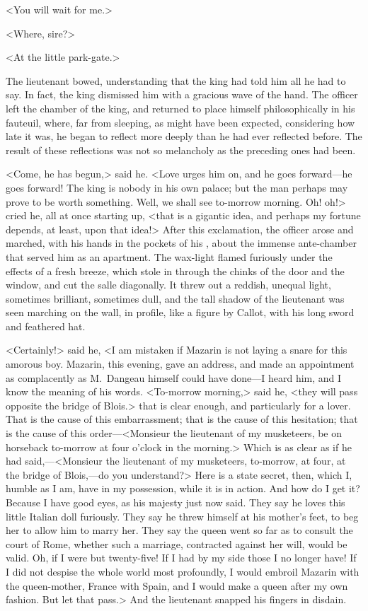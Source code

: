 <You will wait for me.>

<Where, sire?>

<At the little park-gate.>

The lieutenant bowed, understanding that the king had told him all he had to say. In fact, the king dismissed him with a gracious wave of the hand. The officer left the chamber of the king, and returned to place himself philosophically in his fauteuil, where, far from sleeping, as might have been expected, considering how late it was, he began to reflect more deeply than he had ever reflected before. The result of these reflections was not so melancholy as the preceding ones had been.

<Come, he has begun,> said he. <Love urges him on, and he goes forward—he goes forward! The king is nobody in his own palace; but the man perhaps may prove to be worth something. Well, we shall see to-morrow morning. Oh! oh!> cried he, all at once starting up, <that is a gigantic idea,  and perhaps my fortune depends, at least, upon that idea!> After this exclamation, the officer arose and marched, with his hands in the pockets of his , about the immense ante-chamber that served him as an apartment. The wax-light flamed furiously under the effects of a fresh breeze, which stole in through the chinks of the door and the window, and cut the salle diagonally. It threw out a reddish, unequal light, sometimes brilliant, sometimes dull, and the tall shadow of the lieutenant was seen marching on the wall, in profile, like a figure by Callot, with his long sword and feathered hat.

<Certainly!> said he, <I am mistaken if Mazarin is not laying a snare for this amorous boy. Mazarin, this evening, gave an address, and made an appointment as complacently as M.~Dangeau himself could have done—I heard him, and I know the meaning of his words. <To-morrow morning,> said he, <they will pass opposite the bridge of Blois.>  that is clear enough, and particularly for a lover. That is the cause of this embarrassment; that is the cause of this hesitation; that is the cause of this order—<Monsieur the lieutenant of my musketeers, be on horseback to-morrow at four o'clock in the morning.> Which is as clear as if he had said,—<Monsieur the lieutenant of my musketeers, to-morrow, at four, at the bridge of Blois,—do you understand?> Here is a state secret, then, which I, humble as I am, have in my possession, while it is in action. And how do I get it? Because I have good eyes, as his majesty just now said. They say he loves this little Italian doll furiously. They say he threw himself at his mother's feet, to beg her to allow him to marry her. They say the queen went so far as to consult the court of Rome, whether such a marriage, contracted against her will, would be valid. Oh, if I were but twenty-five! If I had by my side those I no longer have! If I did not despise the whole world most profoundly, I would embroil Mazarin with the queen-mother, France with Spain, and I would make a queen after my own fashion. But let that pass.> And the lieutenant snapped his fingers in disdain.

